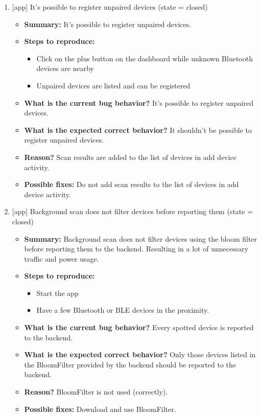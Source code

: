 \begin{enumerate}
\item {[app] It's possible to register unpaired devices (state = closed)}
\begin{itemize}	
	\item \textbf{Summary: }It's possible to register unpaired devices.\\
	\item \textbf{Steps to reproduce: }
	\begin{itemize}
		\item Click on the plus button on the dashboard while unknown Bluetooth devices are nearby
		\item Unpaired devices are listed and can be registered
	\end{itemize}
	\item \textbf{What is the current bug behavior? }It's possible to register unpaired devices.\\
	\item \textbf{What is the expected correct behavior? }It shouldn't be possible to register unpaired devices.\\
	\item \textbf{Reason? }Scan results are added to the list of devices in add device activity.\\
	\item \textbf{Possible fixes: }Do not add scan results to the list of devices in add device activity.\\
\end{itemize}



\item {[app] Background scan does not filter devices before reporting them (state = closed)}
\begin{itemize}	
	\item \textbf{Summary: }Background scan does not filter devices using the bloom filter before reporting them to the backend. Resulting in a lot of unnecessary traffic and power usage.\\
	\item \textbf{Steps to reproduce: }
	\begin{itemize}
		\item Start the app\\
		\item Have a few Bluetooth or BLE devices in the proximity.\\
	\end{itemize}
	\item \textbf{What is the current bug behavior? }Every spotted device is reported to the backend.\\
	\item \textbf{What is the expected correct behavior? }Only those devices listed in the BloomFilter provided by the backend should be reported to the backend.\\
	\item \textbf{Reason? }BloomFilter is not used (correctly).\\
	\item \textbf{Possible fixes: }Download and use BloomFilter.\\
\end{itemize}



\end{enumerate}
